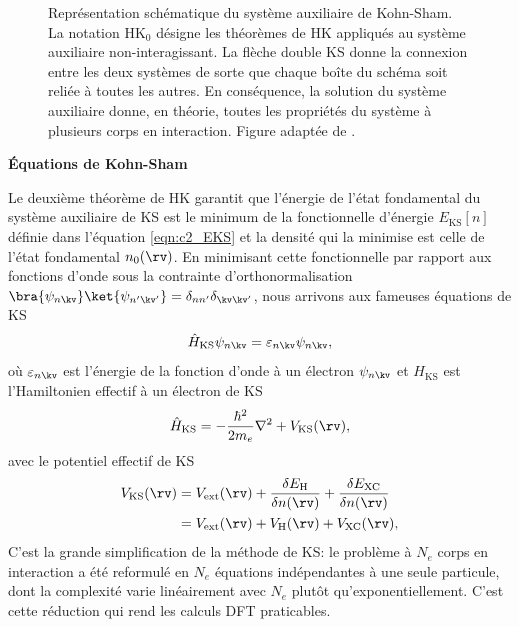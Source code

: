 \begin{figure}[t]
    \centering
    
    \caption[Représentation schématique du système auxiliaire de Kohn-Sham.]{Représentation schématique du système auxiliaire de Kohn-Sham. La notation HK$_0$ désigne les théorèmes de HK appliqués au système auxiliaire non-interagissant. La flèche double KS donne la connexion entre les deux systèmes de sorte que chaque boîte du schéma soit reliée à toutes les autres. En conséquence, la solution du système auxiliaire donne, en théorie, toutes les propriétés du système à plusieurs corps en interaction. Figure adaptée de \cite{martinElectronicStructureBasic2004}.}
    \label{fig:ks}
\end{figure}

\newpage
\noindent\textbf{Équations de Kohn-Sham}

Le deuxième théorème de HK garantit que l'énergie de l'état fondamental du système auxiliaire de KS est le minimum de la fonctionnelle d'énergie $E_\text{KS}[n]$ définie dans l'équation \eqref{eqn:c2_EKS} et la densité qui la minimise est celle de l'état fondamental $n_0(\rv)$. En minimisant cette fonctionnelle par rapport aux fonctions d'onde sous la contrainte d'orthonormalisation $\bra{\psi_{n\kv}}\ket{\psi_{n'\kv'}}=\delta_{nn'}\delta_{\kv\kv'}$, nous arrivons aux fameuses équations de KS
\begin{equation}
    \label{eqn:c2_KS}
    \hat{H}_\text{KS}\psi_{n\kv}=\varepsilon_{n\kv}\psi_{n\kv},
\end{equation}
où $\varepsilon_{n\kv}$ est l'énergie de la fonction d'onde à un électron $\psi_{n\kv}$ et $H_\text{KS}$ est l'Hamiltonien effectif à un électron de KS
\begin{equation}
    \label{eqn:c2_HKS}
    \hat{H}_\text{KS}=-\frac{\hbar^2}{2m_e}\nabla^2+V_\text{KS}(\rv),
\end{equation}
avec le potentiel effectif de KS
\begin{align}
    \label{eqn:c2_VKS}
    V_\text{KS}(\rv)&=V_\text{ext}(\rv)+\frac{\delta E_\text{H}}{\delta n(\rv)}+\frac{\delta E_\text{XC}}{\delta n(\rv)}\notag\\
    &=V_\text{ext}(\rv)+V_\text{H}(\rv)+V_\text{XC}(\rv),
\end{align}
C'est la grande simplification de la méthode de KS: le problème à $N_e$ corps en interaction a été reformulé en $N_e$ équations indépendantes à une seule particule, dont la complexité varie linéairement avec $N_e$ plutôt qu'exponentiellement. C'est cette réduction qui rend les calculs DFT praticables.


